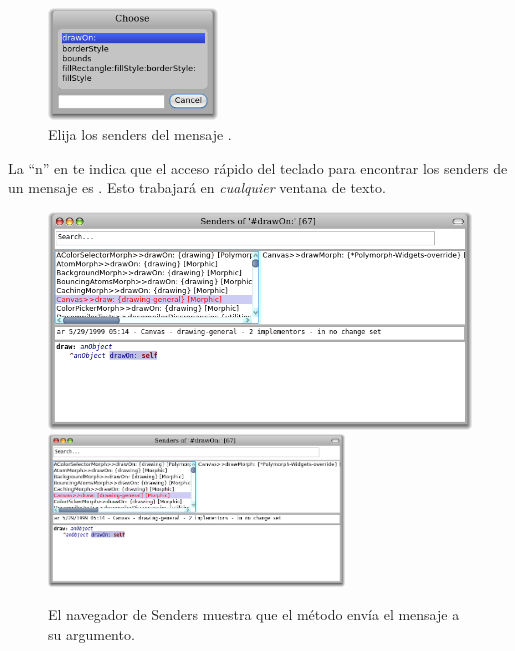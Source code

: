 \documentclass[spanish,a4paper,10pt,twoside]{book}
\begin{document}
\begin{figure}[htb]
\centerline {\includegraphics[width=0.4\textwidth]{SendersOfDrawOn2}}
\caption{Elija los senders del mensaje .}
\end{figure}

La ``n'' en  te indica que el acceso r\'apido del teclado para encontrar los senders de un mensaje es . Esto trabajar\'a en \emph{cualquier} ventana de texto.


\begin{figure}[htbp]
	\begin{center}
   \ifluluelse
		{\includegraphics[width=\textwidth]{CanvasDraw}}
		{\includegraphics[width=0.7\textwidth]{CanvasDraw}}
	\end{center}
	\caption{El navegador de Senders muestra que el m\'etodo  env\'ia el mensaje  a su argumento.	}
\end{figure}
\end{document}
